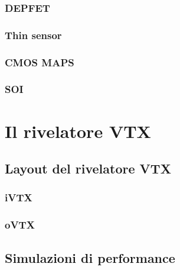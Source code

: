 \documentclass[10pt,a4paper,twoside]{report}
\begin{document}
\subsection{DEPFET}

\subsection{Thin sensor}

\subsection{CMOS MAPS}

\subsection{SOI}


\chapter{Il rivelatore VTX}


\section{Layout del rivelatore VTX}

\subsection{iVTX}

\subsection{oVTX}


\section{Simulazioni di performance}


\end{document}
